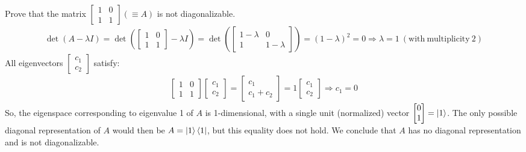  Prove that the matrix $\begin{bmatrix}1 & 0 \\ 1 & 1\end{bmatrix} (\equiv A)$ is not diagonalizable.
\Soln
\begin{align*}\det(A-\lambda I) = 
	\det \left(\begin{bmatrix}
	1 & 0 \\
	1 & 1
	\end{bmatrix} - \lambda I \right) = \det \left(\begin{bmatrix}1-\lambda & 0 \\ 1 & 1-\lambda\end{bmatrix}\right)= (1 - \lambda)^2 = 0 \Rightarrow \lambda = 1\ \mathrm{(with\ multiplicity\ 2)}
\end{align*}
All eigenvectors $\begin{bmatrix}c_1\\c_2\end{bmatrix}$ satisfy:
\begin{align*}
	\begin{bmatrix}
		1 & 0 \\
		1 & 1
	\end{bmatrix}
	\begin{bmatrix}
		c_1 \\
		c_2
	\end{bmatrix} =
	\begin{bmatrix}
	      c_1 \\
	      c_1+c_2
	\end{bmatrix} =
	 1
	\begin{bmatrix}
		c_1 \\
		c_2
	\end{bmatrix}
	\Rightarrow c_1 = 0
\end{align*}
So, the eigenspace corresponding to eigenvalue 1 of $A$ is 1-dimensional, with a single unit (normalized) vector $\begin{bmatrix}0 \\ 1\end{bmatrix}=\ket{1}$. The only possible diagonal representation of $A$ would then be $A = \ket{1}\bra{1}$, but this equality does not hold.  We conclude that $A$ has no diagonal representation and is not diagonalizable.

